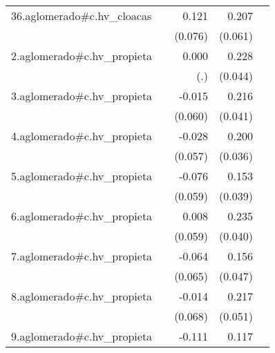 {\begin{longtable}{l*{4}{D{.}{.}{-1}}}
\addlinespace
36.aglomerado#c.hv\_cloacas&                     &       0.121         &       0.207\sym{***}&                     \\
            &                     &     (0.076)         &     (0.061)         &                     \\
\addlinespace
2.aglomerado#c.hv\_propieta&                     &       0.000         &       0.228\sym{***}&                     \\
            &                     &         (.)         &     (0.044)         &                     \\
\addlinespace
3.aglomerado#c.hv\_propieta&                     &      -0.015         &       0.216\sym{***}&                     \\
            &                     &     (0.060)         &     (0.041)         &                     \\
\addlinespace
4.aglomerado#c.hv\_propieta&                     &      -0.028         &       0.200\sym{***}&                     \\
            &                     &     (0.057)         &     (0.036)         &                     \\
\addlinespace
5.aglomerado#c.hv\_propieta&                     &      -0.076         &       0.153\sym{***}&                     \\
            &                     &     (0.059)         &     (0.039)         &                     \\
\addlinespace
6.aglomerado#c.hv\_propieta&                     &       0.008         &       0.235\sym{***}&                     \\
            &                     &     (0.059)         &     (0.040)         &                     \\
\addlinespace
7.aglomerado#c.hv\_propieta&                     &      -0.064         &       0.156\sym{***}&                     \\
            &                     &     (0.065)         &     (0.047)         &                     \\
\addlinespace
8.aglomerado#c.hv\_propieta&                     &      -0.014         &       0.217\sym{***}&                     \\
            &                     &     (0.068)         &     (0.051)         &                     \\
\addlinespace
9.aglomerado#c.hv\_propieta&                     &      -0.111         &       0.117\sym{**} &                     \\

\end{longtable}}

